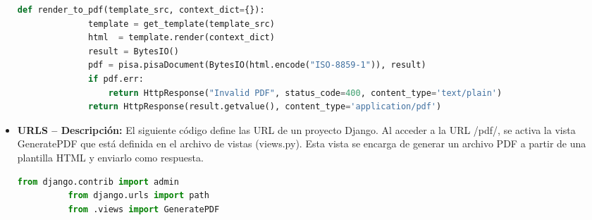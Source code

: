 \documentclass{article}
\begin{document}
\begin{itemize}
\begin{lstlisting}[language=Python]
          def render_to_pdf(template_src, context_dict={}):
              template = get_template(template_src)
              html  = template.render(context_dict)
              result = BytesIO()
              pdf = pisa.pisaDocument(BytesIO(html.encode("ISO-8859-1")), result)
              if pdf.err:
                  return HttpResponse("Invalid PDF", status_code=400, content_type='text/plain')
              return HttpResponse(result.getvalue(), content_type='application/pdf')
        \end{lstlisting}
      \item \textbf{URLS -- Descripción: }El siguiente código define las URL de un proyecto Django. Al acceder a la URL /pdf/, 
        se activa la vista GeneratePDF que está definida en el archivo de vistas (views.py). Esta vista se encarga de generar 
        un archivo PDF a partir de una plantilla HTML y enviarlo como respuesta.
        \begin{lstlisting}[language=Python]
          from django.contrib import admin
          from django.urls import path
          from .views import GeneratePDF


\end{lstlisting}
\end{itemize}
\end{document}
